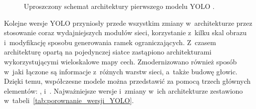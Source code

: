 \begin{figure}[ht] %
    \centering
    \caption{Uproszczony schemat architektury pierwszego modelu YOLO \cite{bib:redmon2016lookonceunifiedrealtime}.}
    \label{fig:yolov1_architektura}
\end{figure}


Kolejne wersje YOLO przyniosły przede wszystkim zmiany w~architekturze przez stosowanie coraz wydajniejszych modułów sieci, korzystanie z~kilku skal obrazu i~modyfikację sposobu generowania ramek ograniczających. Z~czasem architekturę opartą na pojedynczej siatce zastąpiono architekturami wykorzystującymi wieloskalowe mapy cech. Zmodernizowano również sposób w~jaki łączone są informacje z~różnych warstw sieci, a~także budowę głowic. Dzięki temu, współczesne modele można przedstawić za pomocą trzech głównych elementów: ,  i~. Najważniejsze wersje i~zmiany w~ich architekturze zestawiono w~tabeli~\ref{tab:porownanie_wersji_YOLO}.

